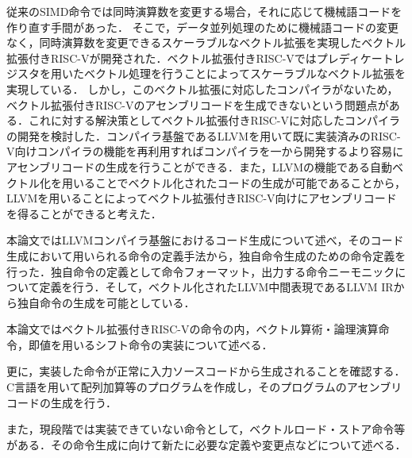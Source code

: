 従来のSIMD命令では同時演算数を変更する場合，それに応じて機械語コードを作り直す手間があった．
そこで，データ並列処理のために機械語コードの変更なく，同時演算数を変更できるスケーラブルなベクトル拡張を実現したベクトル拡張付きRISC-Vが開発された．ベクトル拡張付きRISC-Vではプレディケートレジスタを用いたベクトル処理を行うことによってスケーラブルなベクトル拡張を実現している．
しかし，このベクトル拡張に対応したコンパイラがないため，ベクトル拡張付きRISC-Vのアセンブリコードを生成できないという問題点がある．これに対する解決策としてベクトル拡張付きRISC-Vに対応したコンパイラの開発を検討した．コンパイラ基盤であるLLVMを用いて既に実装済みのRISC-V向けコンパイラの機能を再利用すればコンパイラを一から開発するより容易にアセンブリコードの生成を行うことができる．また，LLVMの機能である自動ベクトル化を用いることでベクトル化されたコードの生成が可能であることから，LLVMを用いることによってベクトル拡張付きRISC-V向けにアセンブリコードを得ることができると考えた．

本論文ではLLVMコンパイラ基盤におけるコード生成について述べ，そのコード生成において用いられる命令の定義手法から，独自命令生成のための命令定義を行った．独自命令の定義として命令フォーマット，出力する命令ニーモニックについて定義を行う．そして，ベクトル化されたLLVM中間表現であるLLVM IRから独自命令の生成を可能としている．

本論文ではベクトル拡張付きRISC-Vの命令の内，ベクトル算術・論理演算命令，即値を用いるシフト命令の実装について述べる．

更に，実装した命令が正常に入力ソースコードから生成されることを確認する．C言語を用いて配列加算等のプログラムを作成し，そのプログラムのアセンブリコードの生成を行う．

また，現段階では実装できていない命令として，ベクトルロード・ストア命令等がある．その命令生成に向けて新たに必要な定義や変更点などについて述べる．